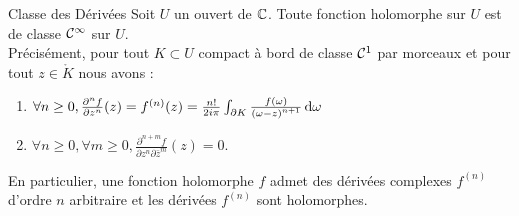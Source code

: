 \documentclass{cours}
\begin{document}
\begin{corollaire}{Classe des Dérivées}{}
    Soit $U$ un ouvert de $\mathbb{C}$. Toute fonction holomorphe sur $U$ est de classe $\mathcal{C}^{\infty}$ sur $U$.\\
    Précisément, pour tout $K \subset U$ compact à bord de classe $\mathcal{C}^{1}$ par morceaux et pour tout $z \in \mathring{K}$ nous avons : 
    \begin{enumerate}
        \item $\forall n \geq 0, \frac{\partial^{n}f}{\partial z^{n}}(z) = f^{(n)}(z) = \frac{n!}{2i\pi}\int_{\partial K}\frac{f(\omega)}{\left(\omega - z\right)^{n + 1}}{\rm \, d} \omega$
        \item $\forall n \geq 0, \forall m \geq 0, \frac{\partial^{n + m}f}{\partial z^{n}\partial \bar{z}^{m}}(z) = 0$.
    \end{enumerate}
    En particulier, une fonction holomorphe $f$ admet des dérivées complexes $f^{(n)}$ d'ordre $n$ arbitraire et les dérivées $f^{(n)}$ sont holomorphes.
\end{corollaire}
\end{document}
